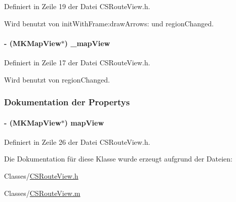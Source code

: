 Definiert in Zeile 19 der Datei CSRouteView.h.

Wird benutzt von initWithFrame:drawArrows: und regionChanged.\hypertarget{interface_c_s_route_view_a3178cd8d5a40441d57450b035e0ccb0b}{
\paragraph[{\_\-mapView}]{\setlength{\rightskip}{0pt plus 5cm}-\/ (MKMapView$\ast$) {\bf \_\-mapView}}\hfill}
\label{interface_c_s_route_view_a3178cd8d5a40441d57450b035e0ccb0b}


Definiert in Zeile 17 der Datei CSRouteView.h.

Wird benutzt von regionChanged.

\subsubsection{Dokumentation der Propertys}
\hypertarget{interface_c_s_route_view_a52bb7d64fe9655c610dd8815851059a1}{
\paragraph[{mapView}]{\setlength{\rightskip}{0pt plus 5cm}-\/ (MKMapView$\ast$) mapView}\hfill}
\label{interface_c_s_route_view_a52bb7d64fe9655c610dd8815851059a1}


Definiert in Zeile 26 der Datei CSRouteView.h.

Die Dokumentation für diese Klasse wurde erzeugt aufgrund der Dateien:\begin{DoxyCompactItemize}
\item 
Classes/\hyperlink{_c_s_route_view_8h}{CSRouteView.h}\item 
Classes/\hyperlink{_c_s_route_view_8m}{CSRouteView.m}\end{DoxyCompactItemize}

